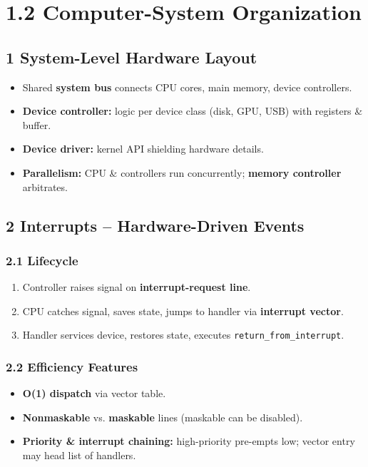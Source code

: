 \documentclass{article}
\begin{document}
\newpage
\section*{1.2 Computer-System Organization}
\subsection*{1 System-Level Hardware Layout}
\begin{itemize}
    \item Shared \textbf{system bus} connects CPU cores, main memory, device controllers.
    \item \textbf{Device controller:} logic per device class (disk, GPU, USB) with registers \& buffer.
    \item \textbf{Device driver:} kernel API shielding hardware details.
    \item \textbf{Parallelism:} CPU \& controllers run concurrently; \textbf{memory controller} arbitrates.
\end{itemize}

\subsection*{2 Interrupts – Hardware-Driven Events}
\subsubsection*{2.1 Lifecycle}
\begin{enumerate}[label=\arabic*.]
    \item Controller raises signal on \textbf{interrupt-request line}.
    \item CPU catches signal, saves state, jumps to handler via \textbf{interrupt vector}.
    \item Handler services device, restores state, executes \texttt{return\_from\_interrupt}.
\end{enumerate}

\subsubsection*{2.2 Efficiency Features}
\begin{itemize}
    \item \textbf{O(1) dispatch} via vector table.
    \item \textbf{Nonmaskable} vs. \textbf{maskable} lines (maskable can be disabled).
    \item \textbf{Priority \& interrupt chaining:} high-priority pre-empts low; vector entry may head list of handlers.
\end{itemize}
\end{document}
